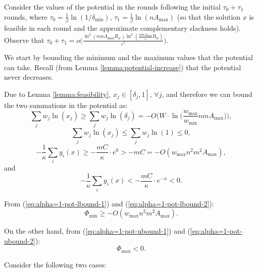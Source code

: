\documentclass[11pt]{article}
\makeatletter
\newcommand{\wratio}{R_w}
\newenvironment{proofof}[1]{\par
  \pushQED{\qed}\normalfont \topsep3\p@\relax
  \trivlist
  \item[\hskip\labelsep
        \bfseries
    Proof of #1\@addpunct{.}]\ignorespaces
}{\popQED\endtrivlist\@endpefalse
}
\makeatother
\begin{document}
\begin{proofof}{Theorem \ref{thm:convergence-alpha=1}}
Consider the values of the potential in the rounds following the initial $\tau_0 + \tau_1$ rounds, where $\tau_0 = \frac{1}{\beta}\ln(1/\delta_{\min})$, $\tau_1 = \frac{1}{\beta}\ln(nA_{\max})$ (so that the solution $x$ is feasible in each round and the approximate complementary slackness holds). Observe that $\tau_0+\tau_1 = o\Big(\frac{\ln^2\left(nmA_{\max}\wratio\right)\ln^2\left(\frac{nmA_{\max}}{\varepsilon}\wratio\right)}{\varepsilon^5}\Big)$.

We start by bounding the minimum and the maximum values that the potential can take. Recall (from Lemma \ref{lemma:potential-increase}) that the potential never decreases.

Due to Lemma \ref{lemma:feasibility}, $x_j\in [\delta_j, 1]$, $\forall j$, and therefore we can bound the two summations in the potential as:
\begin{equation}
\sum_j w_j \ln(x_j)\geq \sum_j w_j \ln(\delta_j) = - O\Big(W\cdot\ln\Big(\frac{w_{\max}}{ w_{\min}}nmA_{\max}\Big)\Big), \label{eq:alpha=1-pot-lbound-1}
\end{equation}
\begin{equation}
\sum_j w_j \ln(x_j)\leq \sum_j w_j \ln(1) \leq 0, \label{eq:alpha=1-pot-ubound-1}
\end{equation}
\begin{equation}
-\frac{1}{\kappa} \sum_i y_i(x) \geq -\frac{mC}{\kappa}\cdot e^{0} > -mC = -O(w_{\max}n^2m^2A_{\max}), \label{eq:alpha=1-pot-lbound-2}
\end{equation}
and
\begin{equation}
-\frac{1}{\kappa} \sum_i y_i(x) < -\frac{mC}{\kappa}\cdot e^{-\kappa} < 0. \label{eq:alpha=1-pot-ubound-2}
\end{equation}

From (\ref{eq:alpha=1-pot-lbound-1}) and (\ref{eq:alpha=1-pot-lbound-2}):
\begin{equation}
\Phi_{\min} \geq -O(w_{\max}n^2m^2A_{\max}). \label{eq:alpha=1-phi-min}
\end{equation}

On the other hand, from (\ref{eq:alpha=1-pot-ubound-1}) and (\ref{eq:alpha=1-pot-ubound-2}):
\begin{equation}
\Phi_{\max} <0. \label{eq:alpha=1-phi-max}
\end{equation}

Consider the following two cases:


\end{proofof}
\end{document}
